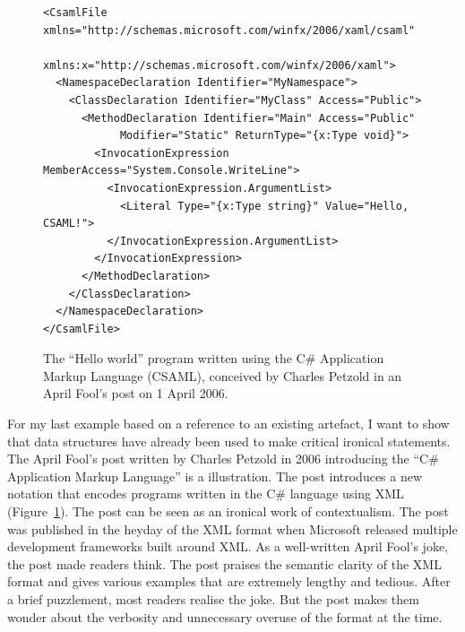 \begin{figure}
\begin{lstlisting}[language=csxml]
<CsamlFile xmlns="http://schemas.microsoft.com/winfx/2006/xaml/csaml"
      xmlns:x="http://schemas.microsoft.com/winfx/2006/xaml">
  <NamespaceDeclaration Identifier="MyNamespace">
    <ClassDeclaration Identifier="MyClass" Access="Public">
      <MethodDeclaration Identifier="Main" Access="Public"
            Modifier="Static" ReturnType="{x:Type void}">
        <InvocationExpression MemberAccess="System.Console.WriteLine">
          <InvocationExpression.ArgumentList>
            <Literal Type="{x:Type string}" Value="Hello, CSAML!">
          </InvocationExpression.ArgumentList>
        </InvocationExpression>
      </MethodDeclaration>
    </ClassDeclaration>
  </NamespaceDeclaration>
</CsamlFile>
\end{lstlisting}
\caption{The ``Hello world'' program written using the C\# Application Markup Language (CSAML),
conceived by Charles Petzold in an April Fool's post on 1 April 2006.}
\label{fig:csaml}
\end{figure}

For my last example based on a reference to an existing artefact, I want to show that
data structures have already been used to make critical ironical statements. The April Fool's
post written by Charles Petzold in 2006 introducing the ``C\# Application Markup Language''
is a illustration.
The post introduces a new notation that encodes programs written in the C\# language
using XML (Figure~\ref{fig:csaml}). The post can be seen as an ironical work of contextualism.
The post was published in the heyday of the XML format when Microsoft released multiple
development frameworks built around XML. As a well-written April Fool's joke, the post
made readers think. The post praises the semantic clarity of the XML format and gives
various examples that are extremely lengthy and tedious. After a brief puzzlement, most readers
realise the joke. But the post makes them wonder about the verbosity and unnecessary
overuse of the format at the time.

